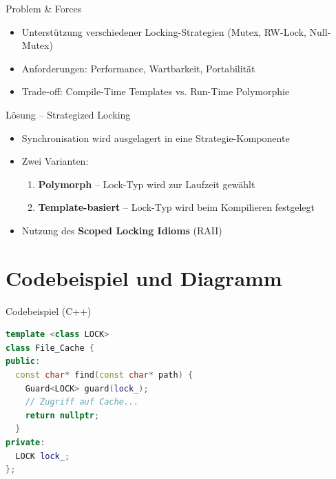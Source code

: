 \documentclass[aspectratio=169,10pt]{beamer}
\begin{document}
\begin{frame}{Problem \& Forces}
  \begin{itemize}
    \item Unterst\"utzung verschiedener Locking-Strategien (Mutex, RW-Lock, Null-Mutex)
    \item Anforderungen: Performance, Wartbarkeit, Portabilit\"at
    \item Trade-off: Compile-Time Templates vs. Run-Time Polymorphie
  \end{itemize}
\end{frame}

\begin{frame}{L\"osung -- Strategized Locking}
  \begin{itemize}
    \item Synchronisation wird ausgelagert in eine Strategie-Komponente
    \item Zwei Varianten:
      \begin{enumerate}
        \item \textbf{Polymorph} -- Lock-Typ wird zur Laufzeit gew\"ahlt
        \item \textbf{Template-basiert} -- Lock-Typ wird beim Kompilieren festgelegt
      \end{enumerate}
    \item Nutzung des \textbf{Scoped Locking Idioms} (RAII)
  \end{itemize}
\end{frame}

\section{Codebeispiel und Diagramm}
\begin{frame}[fragile]{Codebeispiel (C++)}
\begin{lstlisting}[language=C++]
template <class LOCK>
class File_Cache {
public:
  const char* find(const char* path) {
    Guard<LOCK> guard(lock_);
    // Zugriff auf Cache...
    return nullptr;
  }
private:
  LOCK lock_;
};
\end{lstlisting}
\end{frame}
\end{document}
